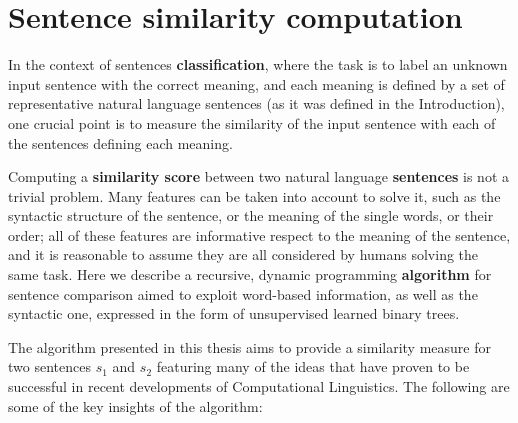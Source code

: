 
\chapter{Sentence similarity computation} %

\label{ch:M2} %


In the context of sentences \textbf{classification}, where the task is to label an unknown input sentence with the correct meaning, and each meaning is defined by a set of representative natural language sentences (as it was defined in the Introduction), one crucial point is to measure the similarity of the input sentence with each of the sentences defining each meaning.

Computing a \textbf{similarity score} between two natural language \textbf{sentences} is not a trivial problem. Many features can be taken into account to solve it, such as the syntactic structure of the sentence, or the meaning of the single words, or their order; all of these features are informative respect to the meaning of the sentence, and it is reasonable to assume they are all considered by humans solving the same task. Here we describe a recursive, dynamic programming \textbf{algorithm} for sentence comparison aimed to exploit word-based information, as well as the syntactic one, expressed in the form of unsupervised learned binary trees.


The algorithm presented in this thesis aims to provide a similarity measure for two sentences $s_1$ and $s_2$ featuring many of the ideas that have proven to be successful in recent developments of Computational Linguistics. The following are some of the key insights of the algorithm:

